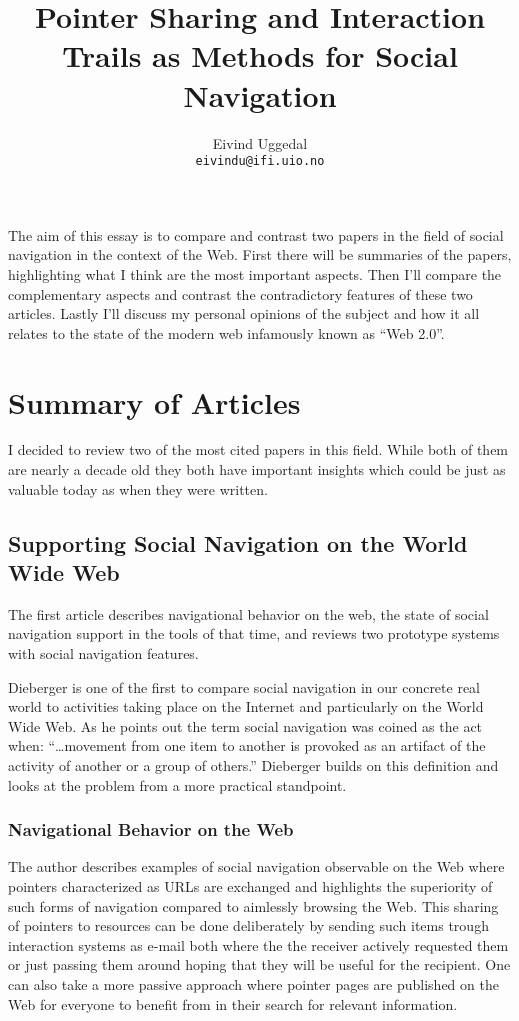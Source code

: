 \documentclass[12pt,a4paper]{article}
\title{Pointer Sharing and Interaction Trails
       as Methods for Social Navigation}
\author{Eivind Uggedal\\
        \texttt{eivindu@ifi.uio.no}}
\date{}
\begin{document}
\maketitle{}

The aim of this essay is to compare and contrast two papers in the field of
social navigation in the context of the Web. First there will be summaries
of the papers, highlighting what I think are the most important aspects.
Then I'll compare the complementary aspects and contrast the contradictory
features of these two articles. Lastly I'll discuss my personal
opinions of the subject and how it all relates to the state of the modern web
infamously known as ``Web 2.0''.

\section{Summary of Articles}

I decided to review two of the most cited papers in this field. While both of
them are nearly a decade old they both have important insights which could be
just as valuable today as when they were written.

\subsection{Supporting Social Navigation on the World Wide Web}
The first article \cite{dieberger97} describes navigational behavior on the
web, the state of social navigation support in the tools of that time, and
reviews two prototype systems with social navigation features.

Dieberger is one of the first to compare social navigation in our concrete
real world to activities taking place on the Internet and particularly on the
World Wide Web. As he points out the term social navigation was coined as the
act when:
``\ldots movement from one item to another is provoked as an artifact of the
activity of another or a group of others.'' \cite{dourish94} Dieberger builds
on this definition and looks at the problem from a more practical standpoint.

\subsubsection{Navigational Behavior on the Web}

The author describes examples of social navigation observable on the Web where
pointers characterized as URLs are exchanged and highlights the superiority of
such forms of navigation compared to aimlessly browsing the Web. This sharing
of pointers to resources can be done deliberately by sending such
items trough interaction systems as e-mail both where the the receiver
actively requested them or just passing them around hoping that they
will be useful for the recipient. One can also take a more passive approach
where pointer pages are published on the Web for everyone to benefit from in
their search for relevant information.
\end{document}
